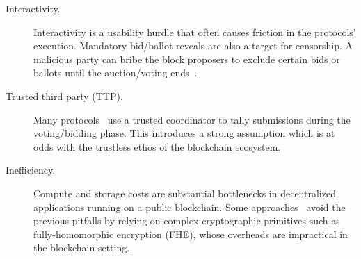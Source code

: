 \begin{description}
    \item[Interactivity.] Interactivity is a usability hurdle that often causes friction in the protocols' execution. Mandatory bid/ballot reveals are also a target for censorship.     
    A malicious party can bribe the block proposers to exclude certain bids or ballots until the auction/voting ends~\cite{ARXIV:PaiResFox23}. %
    \item[Trusted third party (TTP).] Many protocols~\cite{maci} use a trusted coordinator to tally submissions during the voting/bidding phase. This introduces a strong assumption which is at odds with the trustless ethos of the blockchain ecosystem.
    \item[Inefficiency.] 
    Compute and storage costs are substantial bottlenecks in decentralized applications running on a public blockchain. Some approaches~\cite{PQCRYPTO:CGGI16,CCS:DLNS17} avoid the previous pitfalls by relying on complex cryptographic primitives such as fully-homomorphic encryption (FHE), whose overheads are impractical in the blockchain setting.
\end{description}